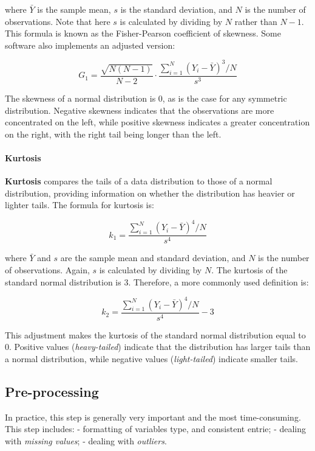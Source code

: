 \documentclass[
]{article}
\begin{document}
where \(\bar{Y}\) is the sample mean, \(s\) is the standard deviation,
and \(N\) is the number of observations. Note that here \(s\) is
calculated by dividing by \(N\) rather than \(N-1\). This formula is
known as the Fisher-Pearson coefficient of skewness. Some software also
implements an adjusted version:

\[
G_1 = \frac{\sqrt{N(N-1)}}{N-2} \cdot \frac{\sum_{i=1}^N (Y_i - \bar{Y})^3 / N}{s^3}
\]

The skewness of a normal distribution is 0, as is the case for any
symmetric distribution. Negative skewness indicates that the
observations are more concentrated on the left, while positive skewness
indicates a greater concentration on the right, with the right tail
being longer than the left.

\hypertarget{kurtosis}{%
\paragraph{Kurtosis}\label{kurtosis}}

\textbf{Kurtosis} compares the tails of a data distribution to those of
a normal distribution, providing information on whether the distribution
has heavier or lighter tails. The formula for kurtosis is:

\[
k_1 = \frac{\sum_{i=1}^N (Y_i - \bar{Y})^4 / N}{s^4}
\]

where \(\bar{Y}\) and \(s\) are the sample mean and standard deviation,
and \(N\) is the number of observations. Again, \(s\) is calculated by
dividing by \(N\). The kurtosis of the standard normal distribution is
3. Therefore, a more commonly used definition is:

\[
k_2 = \frac{\sum_{i=1}^N (Y_i - \bar{Y})^4 / N}{s^4} - 3
\]

This adjustment makes the kurtosis of the standard normal distribution
equal to 0. Positive values (\textit{heavy-tailed}) indicate that the
distribution has larger tails than a normal distribution, while negative
values (\textit{light-tailed}) indicate smaller tails.

\hypertarget{pre-processing}{%
\subsection{Pre-processing}\label{pre-processing}}

In practice, this step is generally very important and the most
time-consuming. This step includes: - formatting of variables type, and
consistent entrie; - dealing with \emph{missing values}; - dealing with
\emph{outliers}.
\end{document}
